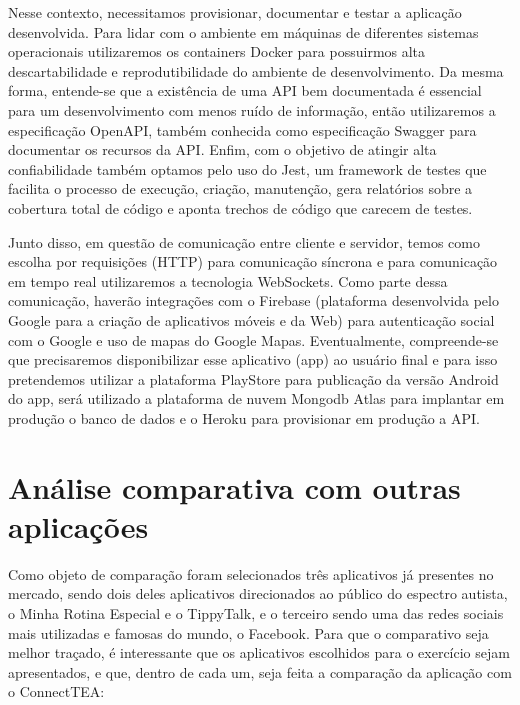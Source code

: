 \begin{apendicesenv}
	Nesse contexto, necessitamos provisionar, documentar e testar a aplicação desenvolvida. Para lidar com o ambiente em máquinas de diferentes sistemas operacionais utilizaremos os containers Docker para possuirmos alta descartabilidade e reprodutibilidade do ambiente de desenvolvimento. Da mesma forma, entende-se que a existência de uma API bem documentada é essencial para um desenvolvimento com menos ruído de informação, então utilizaremos a especificação OpenAPI, também conhecida como especificação Swagger para documentar os recursos da API. Enfim, com o objetivo de atingir alta confiabilidade também optamos pelo uso do Jest, um framework de testes que facilita o processo de execução, criação, manutenção, gera relatórios sobre a cobertura total de código e aponta trechos de código que carecem de testes.
	
	Junto disso, em questão de comunicação entre cliente e servidor, temos como escolha por requisições (HTTP) para comunicação síncrona e para comunicação em tempo real utilizaremos a tecnologia WebSockets. Como parte dessa comunicação, haverão integrações com o Firebase (plataforma desenvolvida pelo Google para a criação de aplicativos móveis e da Web) para autenticação social com o Google e uso de mapas do Google Mapas.
	Eventualmente, compreende-se que precisaremos disponibilizar esse aplicativo (app) ao usuário final e para isso pretendemos utilizar a plataforma PlayStore para publicação da versão Android do app, será utilizado a plataforma de nuvem Mongodb Atlas para implantar em produção o banco de dados e o Heroku para provisionar em produção a API.
	
	
	
	\section{Análise comparativa com outras aplicações}
	Como objeto de comparação foram selecionados três aplicativos já presentes no mercado, sendo dois deles aplicativos direcionados ao público do espectro autista, o Minha Rotina Especial e o TippyTalk, e o terceiro sendo uma das redes sociais mais utilizadas e famosas do mundo, o Facebook.
	Para que o comparativo seja melhor traçado, é interessante que os aplicativos escolhidos para o exercício sejam apresentados, e que, dentro de cada um, seja feita a comparação da aplicação com o ConnectTEA:
	

\end{apendicesenv}

